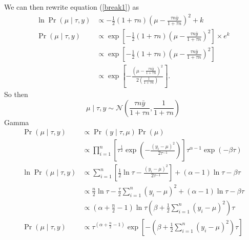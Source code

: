 \documentclass[letterpaper]{amsart}
\begin{document}
We can then rewrite equation (\ref{break1}) as
\begin{align}
  \ln
  \Pr(\mu\mid\tau, y)
  &\propto
    -\frac{1}{2}
    \left(1+\tau n\right)
    \left(\mu - \frac{\tau n\bar{y}}{1+\tau n}\right)^2
    + k
  \\
  \Pr(\mu\mid\tau, y)
  &\propto
    \exp\left[
    -\frac{1}{2}
    \left(1+\tau n\right)
    \left(\mu - \frac{\tau n\bar{y}}{1+\tau n}\right)^2
    \right]
    \times
    e^k
  \\
  &\propto
    \exp\left[
    -\frac{1}{2}
    \left(1+\tau n\right)
    \left(\mu - \frac{\tau n\bar{y}}{1+\tau n}\right)^2
    \right]
  \\
  &\propto
    \exp\left[
    -\frac{
    \left(\mu - \frac{\tau n\bar{y}}{1+\tau n}\right)^2
    }{
    2\left(\frac{1}{1+\tau n}\right)
    }
    \right].
\end{align}
So then
\begin{equation}
  \mu\mid\tau,y
  \sim \mathcal{N}\left(\frac{\tau n\bar{y}}{1+\tau n},
\frac{1}{1+\tau n}\right)
\end{equation}
Gamma
\begin{align}
  \Pr(\mu\mid\tau, y)
  &\propto
    \Pr(y\mid\tau, \mu)
    \Pr(\mu)
  \\
  &\propto
    \prod_{i=1}^n
    \left[
    \tau^{\frac{1}{2}}
    \exp\left(-\frac{\left(y_i-\mu\right)^2}{2\tau^{-1}}\right)
    \right]
    \tau^{\alpha-1}
    \exp(-\beta\tau)
  \\
  \ln
  \Pr(\mu\mid\tau, y)
  &\propto
    \sum_{i=1}^n
    \left[
    \frac{1}{2}
    \ln\tau
    -\frac{\left(y_i-\mu\right)^2}{2\tau^{-1}}
    \right]
    + (\alpha-1)\ln\tau
    -\beta\tau
  \\
  &\propto
    \frac{n}{2}\ln\tau
    -\frac{\tau}{2}
    \sum_{i=1}^n
    \left(y_i-\mu\right)^2
    + (\alpha-1)\ln\tau
    -\beta\tau
  \\
  &\propto
    (\alpha
    +\frac{n}{2}
    - 1)
    \ln\tau
    \left(
    \beta
    +\frac{1}{2}
    \sum_{i=1}^n
    \left(y_i-\mu\right)^2
  \right)
    \tau
  \\
  \Pr(\mu\mid\tau, y)
  &\propto
    \tau^{
    (\alpha
    +\frac{n}{2}
    - 1)
    }
    \exp
    \left[
    -
    \left(
    \beta
    +\frac{1}{2}
    \sum_{i=1}^n
    \left(y_i-\mu\right)^2
  \right)
    \tau
 \right]
\end{align}
\end{document}
